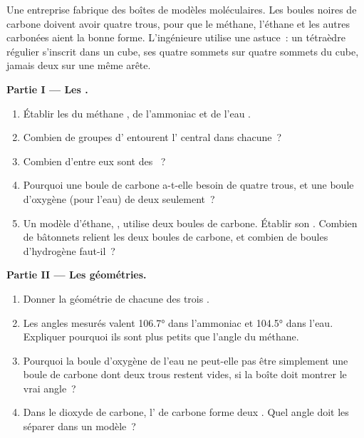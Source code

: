 \begin{problem}
\label{pb:g10:lewis-and-shape:1}
Une entreprise fabrique des boîtes de modèles moléculaires. Les boules
noires de carbone doivent avoir quatre trous, pour que le méthane,
l'éthane et les autres  carbonées aient la bonne forme.
L'ingénieure utilise une astuce~: un tétraèdre régulier s'inscrit dans
un cube, ses quatre sommets sur quatre sommets du cube, jamais deux sur
une même arête.

\medskip
\noindent\textbf{Partie I --- Les .}
\begin{enumerate}
  \item Établir les  du méthane , de l'ammoniac
         et de l'eau .
  \item Combien de groupes d' entourent l' central dans
        chacune~?
  \item Combien d'entre eux sont des ~?
  \item Pourquoi une boule de carbone a-t-elle besoin de quatre trous, et
        une boule d'oxygène (pour l'eau) de deux seulement~?
  \item Un modèle d'éthane, , utilise deux boules de carbone.
        Établir son . Combien de bâtonnets relient les deux
        boules de carbone, et combien de boules d'hydrogène faut-il~?
\end{enumerate}

\medskip
\noindent\textbf{Partie II --- Les géométries.}
\begin{enumerate}[resume]
  \item Donner la géométrie de chacune des trois .
  \item Les angles mesurés valent \ang{106.7} dans l'ammoniac et
        \ang{104.5} dans l'eau. Expliquer pourquoi ils sont plus petits
        que l'angle du méthane.
  \item Pourquoi la boule d'oxygène de l'eau ne peut-elle pas être
        simplement une boule de carbone dont deux trous restent vides, si
        la boîte doit montrer le vrai angle~?
  \item Dans le dioxyde de carbone, l' de carbone forme deux
        . Quel angle doit les séparer dans un modèle~?
\end{enumerate}


\end{problem}
